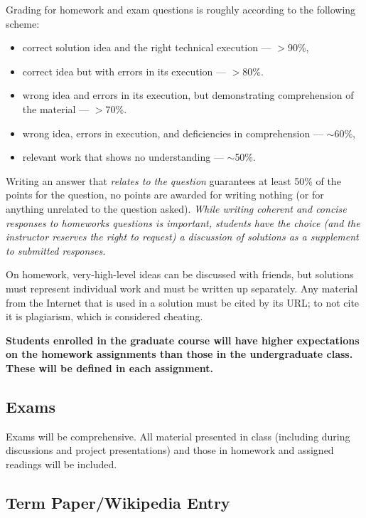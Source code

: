 \documentclass[12pt]{scrartcl}
\begin{document}
Grading for homework and exam questions is roughly according to the following scheme:
\begin{itemize}
\item correct solution idea and the right technical execution --- $>$90\%, 
\item correct idea but with errors in its execution --- $>$80\%. 
\item wrong idea and errors in its execution, but demonstrating comprehension of the material --- $>$70\%. 
\item wrong idea, errors in execution, and deficiencies in comprehension --- $\sim$60\%, 
\item relevant work that shows no understanding --- $\sim$50\%.
\end{itemize}
Writing an answer that \emph{relates to the question} guarantees at least 50\% of the points for the question, 
no points are awarded for writing nothing (or for anything unrelated to the question asked).
\emph{While writing coherent and concise responses to homeworks questions is important, 
students have the choice (and the instructor reserves the right to request) a discussion of solutions as a supplement to submitted responses. }

On homework, very-high-level ideas can be discussed with friends, but solutions must represent individual work and must be written up separately. 
Any material from the Internet that is used in a solution must be cited by its URL; to not cite it is plagiarism, which is considered cheating.

\textbf{Students enrolled in the graduate course will have higher expectations on the homework assignments than those in the undergraduate class. 
These will be defined in each assignment. }

\subsection{Exams}

Exams will be comprehensive. 
All material presented in class (including during discussions and project presentations) 
and those in homework and assigned readings will be included.

\subsection{Term Paper/Wikipedia Entry}
\end{document}
